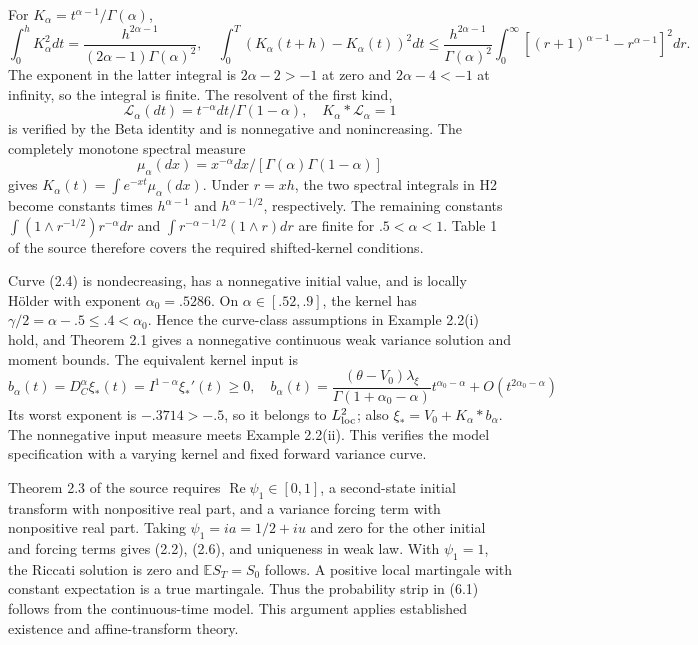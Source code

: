 \documentclass[a4paper,11pt]{article}
\begin{document}
For \(K_\alpha=t^{\alpha-1}/\Gamma(\alpha)\),
\[
\int_0^hK_\alpha^2dt=
\frac{h^{2\alpha-1}}{(2\alpha-1)\Gamma(\alpha)^2},\quad
\int_0^T(K_\alpha(t+h)-K_\alpha(t))^2dt
\le\frac{h^{2\alpha-1}}{\Gamma(\alpha)^2}
\int_0^\infty[(r+1)^{\alpha-1}-r^{\alpha-1}]^2dr.
\tag{A.1}
\]
The exponent in the latter integral is \(2\alpha-2>-1\) at zero and \(2\alpha-4<-1\) at infinity, so the integral is finite. The resolvent of the first kind,
\[
\mathcal L_\alpha(dt)=t^{-\alpha}dt/\Gamma(1-\alpha),\quad
K_\alpha*\mathcal L_\alpha=1
\tag{A.2}
\]
is verified by the Beta identity and is nonnegative and nonincreasing. The completely monotone spectral measure
\[
\mu_\alpha(dx)=x^{-\alpha}dx/
[\Gamma(\alpha)\Gamma(1-\alpha)]
\tag{A.3}
\]
gives \(K_\alpha(t)=\int e^{-xt}\mu_\alpha(dx)\). Under \(r=xh\), the two spectral integrals in H2 become constants times \(h^{\alpha-1}\) and \(h^{\alpha-1/2}\), respectively. The remaining constants
\(\int(1\wedge r^{-1/2})r^{-\alpha}dr\) and
\(\int r^{-\alpha-1/2}(1\wedge r)dr\) are finite for \(.5<\alpha<1\). Table 1 of the source therefore covers the required shifted-kernel conditions.

Curve (2.4) is nondecreasing, has a nonnegative initial value, and is locally Hölder with exponent \(\alpha_0=.5286\). On \(\alpha\in[.52,.9]\), the kernel has \(\gamma/2=\alpha-.5\le.4<\alpha_0\). Hence the curve-class assumptions in Example 2.2(i) hold, and Theorem 2.1 gives a nonnegative continuous weak variance solution and moment bounds. The equivalent kernel input is
\[
b_\alpha(t)=D_C^\alpha\xi_*(t)=I^{1-\alpha}\xi_*'(t)\ge0,\quad
b_\alpha(t)=
\frac{(\theta-V_0)\lambda_\xi}{\Gamma(1+\alpha_0-\alpha)}
t^{\alpha_0-\alpha}+O(t^{2\alpha_0-\alpha})
\tag{A.4}
\]
Its worst exponent is \(-.3714>-.5\), so it belongs to \(L^2_{\rm loc}\); also \(\xi_*=V_0+K_\alpha*b_\alpha\). The nonnegative input measure meets Example 2.2(ii). This verifies the model specification with a varying kernel and fixed forward variance curve.

Theorem 2.3 of the source requires \(\operatorname{Re}\psi_1\in[0,1]\), a second-state initial transform with nonpositive real part, and a variance forcing term with nonpositive real part. Taking \(\psi_1=ia=1/2+iu\) and zero for the other initial and forcing terms gives (2.2), (2.6), and uniqueness in weak law. With \(\psi_1=1\), the Riccati solution is zero and \(\mathbb E S_T=S_0\) follows. A positive local martingale with constant expectation is a true martingale. Thus the probability strip in (6.1) follows from the continuous-time model. This argument applies established existence and affine-transform theory.
\end{document}
